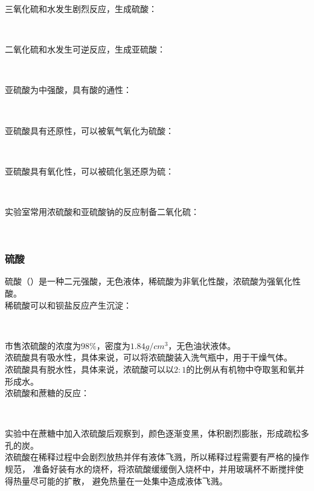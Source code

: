 \documentclass[UTF8]{ctexart}
\begin{document}
\newpage

    三氧化硫和水发生剧烈反应，生成硫酸：
    \begin{center}
        \\[4mm]
    \end{center}
    二氧化硫和水发生可逆反应，生成亚硫酸：
    \begin{center}
        \\[4mm]
    \end{center}
    亚硫酸为中强酸，具有酸的通性：
    \begin{center}
        \\[4mm]
    \end{center}
    亚硫酸具有还原性，可以被氧气氧化为硫酸：
    \begin{center}
        \\[4mm]
    \end{center}
    亚硫酸具有氧化性，可以被硫化氢还原为硫：
    \begin{center}
        \\[4mm]
    \end{center}
    实验室常用浓硫酸和亚硫酸钠的反应制备二氧化硫：
    \begin{center}
        \\[4mm]
    \end{center}

\subsubsection{硫酸}
    硫酸（）是一种二元强酸，无色液体，稀硫酸为非氧化性酸，浓硫酸为强氧化性酸。\\[3mm]
    稀硫酸可以和钡盐反应产生沉淀：
    \begin{center}
        \\[5mm]
    \end{center}
    市售浓硫酸的浓度为$98\%$，密度为$1.84g/cm^3$，无色油状液体。\\[3mm]
    浓硫酸具有吸水性，具体来说，可以将浓硫酸装入洗气瓶中，用于干燥气体。\\[3mm]
    浓硫酸具有脱水性，具体来说，浓硫酸可以以$2:1$的比例从有机物中夺取氢和氧并形成水。\\[4mm]
    浓硫酸和蔗糖的反应：
    \begin{center}
        \\[6mm]
    \end{center}
    实验中在蔗糖中加入浓硫酸后观察到，颜色逐渐变黑，体积剧烈膨胀，形成疏松多孔的炭。\\[4mm]
    浓硫酸在稀释过程中会剧烈放热并伴有液体飞溅，所以稀释过程需要有严格的操作规范，
    准备好装有水的烧杯，将浓硫酸缓缓倒入烧杯中，并用玻璃杯不断搅拌使得热量尽可能的扩散，
    避免热量在一处集中造成液体飞溅。
\end{document}
